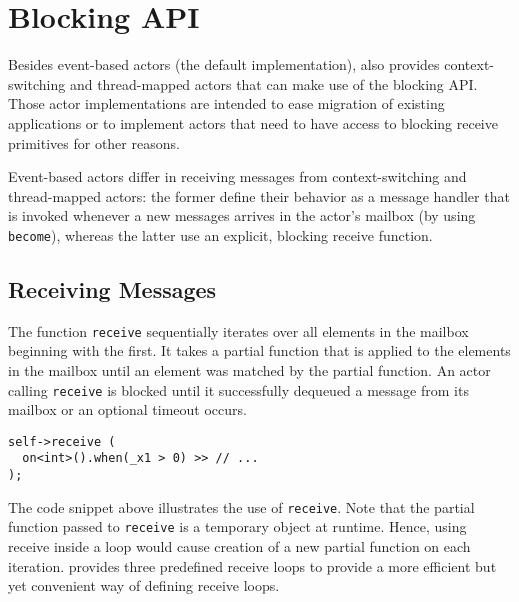 \section{Blocking API}
\label{Sec::BlockingAPI}

Besides event-based actors (the default implementation), \ba also provides context-switching and thread-mapped actors that can make use of the blocking API.
Those actor implementations are intended to ease migration of existing applications or to implement actors that need to have access to blocking receive primitives for other reasons.

Event-based actors differ in receiving messages from context-switching and thread-mapped actors: the former define their behavior as a message handler that is invoked whenever a new messages arrives in the actor's mailbox (by using \lstinline^become^), whereas the latter use an explicit, blocking receive function.

\subsection{Receiving Messages}

The function \lstinline^receive^ sequentially iterates over all elements in the mailbox beginning with the first.
It takes a partial function that is applied to the elements in the mailbox until an element was matched by the partial function.
An actor calling \lstinline^receive^ is blocked until it successfully dequeued a message from its mailbox or an optional timeout occurs.

\begin{lstlisting}
self->receive (
  on<int>().when(_x1 > 0) >> // ...
);
\end{lstlisting}

The code snippet above illustrates the use of \lstinline^receive^.
Note that the partial function passed to \lstinline^receive^ is a temporary object at runtime.
Hence, using receive inside a loop would cause creation of a new partial function on each iteration.
\ba provides three predefined receive loops to provide a more efficient but yet convenient way of defining receive loops.

